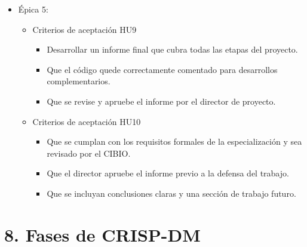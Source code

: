 \documentclass[
11pt, %
]{charter}
\begin{document}
\begin{itemize}
\begin{itemize}
\begin{itemize}
          \item Se elabora una reflexión sobre el aporte original del trabajo en relación a la literatura existente.
        \end{itemize}
    \end{itemize}
  \item Épica 5:
    \begin{itemize}
      \item Criterios de aceptación HU9
        \begin{itemize}
          \item Desarrollar un informe final que cubra todas las etapas del proyecto.
          \item Que el código quede correctamente comentado para desarrollos complementarios.
          \item Que se revise y apruebe el informe por el director de proyecto.
        \end{itemize}
      \item Criterios de aceptación HU10
        \begin{itemize}
          \item Que se cumplan con los requisitos formales de la especialización y sea revisado por el CIBIO.
          \item Que el director apruebe el informe previo a la defensa del trabajo.
          \item Que se incluyan conclusiones claras y una sección de trabajo futuro.
        \end{itemize}
    \end{itemize}
\end{itemize}

\section{8. Fases de CRISP-DM}
\end{document}
